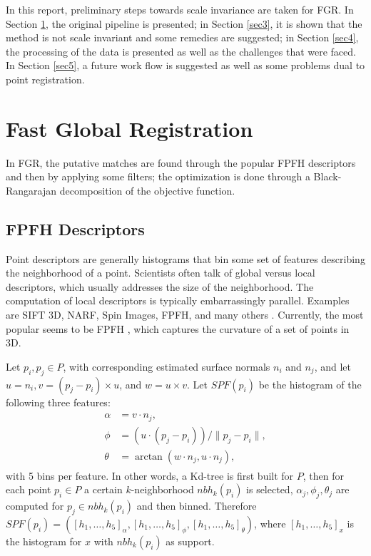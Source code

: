 \documentclass[10pt,a4paper]{article}
\begin{document}
In this report, preliminary steps towards scale invariance are taken for FGR. In Section \ref{sec2}, the original pipeline is presented; in Section \ref{sec3}, it is shown that the method is not scale invariant and some remedies are suggested; in Section \ref{sec4}, the processing of the data is presented as well as the challenges that were faced. In Section \ref{sec5}, a future work flow is suggested as well as some problems dual to point registration. 

\section{Fast Global Registration}\label{sec2}

In FGR, the putative matches are found through the popular FPFH descriptors and then by applying some filters; the optimization is done through a Black-Rangarajan decomposition of the objective function. 

\subsection{FPFH Descriptors}

Point descriptors are generally histograms that bin some set of features describing the neighborhood of a point. Scientists often talk of global versus local descriptors, which usually addresses the size of the neighborhood. The computation of local descriptors is typically embarrassingly parallel. Examples are SIFT 3D, NARF, Spin Images, FPFH, and many others \cite{Overview51:online,hansch2014comparison,rusu2009fast}. Currently, the most popular seems to be FPFH \cite{rusu2009fast}, which captures the curvature of a set of points in 3D. 

Let $p_i, p_j \in P$, with corresponding estimated surface normals $n_i$ and $n_j$, and let $u = n_i, v = (p_j - p_i) \times u$, and $w = u \times v$. Let $SPF(p_i)$ be the histogram of the following three features:
\begin{align}\label{features}
\begin{split}
\alpha &= v \cdot n_j, \\
\phi &= (u \cdot (p_j - p_i))/\|p_j - p_i\|,\\
\theta &= \arctan(w \cdot n_j , u \cdot n_j),
\end{split}
\end{align}
with 5 bins per feature. In other words, a Kd-tree is first built for $P$, then for each point $p_i \in P$ a certain $k$-neighborhood $nbh_k(p_i)$ is selected, $\alpha_j, \phi_j, \theta_j$ are computed for $p_j \in nbh_k(p_i)$ and then binned. Therefore $SPF(p_i) = ([h_1, \ldots, h_5]_\alpha,[h_1, \ldots, h_5]_\phi,[h_1, \ldots, h_5]_\theta)$, where $[h_1, \ldots, h_5]_x$ is the histogram for $x$ with $nbh_k(p_i)$ as support.
\end{document}
